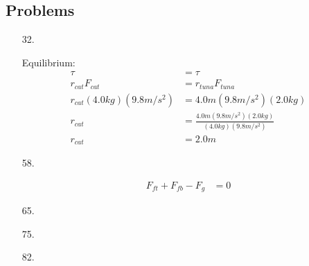 \documentclass[\pointsize, letterpaper]{article}
\begin{document}
    \subsection*{Problems}

    \begin{itemize}
        \item [32.]
        
        Equilibrium:
        \begin{align*}
            \tau    & = \tau                                                \\
            r_{cat}F_{cat}  & = r_{tuna}F_{tuna}                            \\
            r_{cat}(4.0kg)(9.8m/s^{2}) & = 4.0m(9.8m/s^{2})(2.0kg)          \\
            r_{cat} & = \frac{4.0m(9.8m/s^{2})(2.0kg)}{(4.0kg)(9.8m/s^{2})} \\
            r_{cat} & = \boxed{2.0m}
        \end{align*}

        \item [58.]
        
        \begin{align*}
            F_{ft} + F_{fb} - F_{g} & = 0
        \end{align*}

        \item [65.]
        \item [75.]
        \item [82.]
    \end{itemize}
\end{document}
